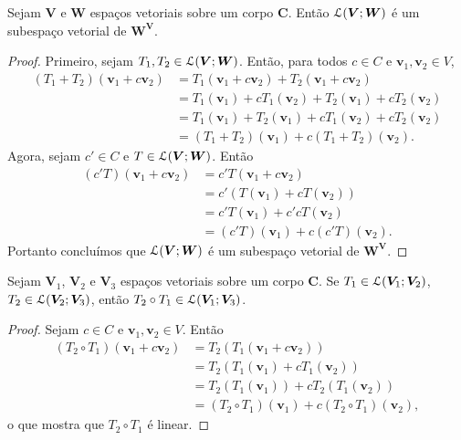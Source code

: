\begin{prop}
	Sejam $\bm V$ e $\bm W$ espaços vetoriais sobre um corpo $\bm C$. Então $\mathcal{L}(\bm V;\bm W)$ é um subespaço vetorial de $\bm {W^V}$.
\end{prop}
\begin{proof}
	Primeiro, sejam $T_1,T_2 \in \mathcal{L}(\bm V;\bm W)$. Então, para todos $c \in C$ e $\bm v_1,\bm v_2 \in V$,
	\begin{align*}
	(T_1+T_2)(\bm v_1+c\bm v_2)&=T_1(\bm v_1+c\bm v_2)+T_2(\bm v_1+c\bm v_2) \\
	&=T_1(\bm v_1)+cT_1(\bm v_2)+T_2(\bm v_1)+cT_2(\bm v_2) \\
	&=T_1(\bm v_1)+T_2(\bm v_1)+cT_1(\bm v_2)+cT_2(\bm v_2) \\
	&=(T_1+T_2)(\bm v_1)+c(T_1+T_2)(\bm v_2).
	\end{align*}
	Agora, sejam $c' \in C$ e $T \in \mathcal{L}(\bm V;\bm W)$. Então
	\begin{align*}
	(c'T)(\bm v_1+c\bm v_2)&=c'T(\bm v_1+c\bm v_2) \\
	&=c'(T(\bm v_1)+cT(\bm v_2)) \\
	&= c'T(\bm v_1)+c'cT(\bm v_2) \\
	&= (c'T)(\bm v_1)+c(c'T)(\bm v_2).
	\end{align*}
Portanto concluímos que $\mathcal{L}(\bm V;\bm W)$ é um subespaço vetorial de $\bm {W^V}$.
\end{proof}

\begin{prop}
	Sejam $\bm V_1$, $\bm V_2$ e $\bm V_3$ espaços vetoriais sobre um corpo $\bm C$. Se $T_1 \in \mathcal{L}(\bm V_1;\bm V_2)$, $T_2 \in \mathcal{L}(\bm V_2;\bm V_3)$, então $T_2 \circ T_1 \in \mathcal{L}(\bm V_1; \bm V_3)$.
\end{prop}
\begin{proof}
	Sejam $c \in C$ e $\bm v_1,\bm v_2 \in V$. Então
	\begin{align*}
	(T_2 \circ T_1)(\bm v_1+c\bm v_2) &= T_2(T_1(\bm v_1+c\bm v_2)) \\
	&=T_2(T_1(\bm v_1)+cT_1(\bm v_2)) \\
	&=T_2(T_1(\bm v_1))+cT_2(T_1(\bm v_2)) \\
	&= (T_2 \circ T_1)(\bm v_1)+c(T_2 \circ T_1)(\bm v_2),
	\end{align*}
o que mostra que $T_2 \circ T_1$ é linear.
\end{proof}

